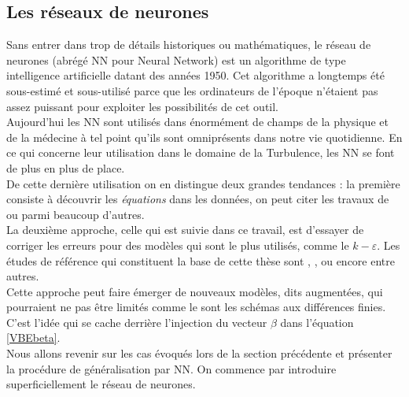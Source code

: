 \documentclass[a4paper,12pt]{article}
\newcommand{\keps}{$k-\varepsilon$}
\newcommand\bk{\color{black}}
\newcommand\brick{\color{brick}}
\numberwithin{equation}{section} %
\begin{document}
\brick \subsection{Les réseaux de neurones} \bk 
\noindent Sans entrer dans trop de détails historiques ou mathématiques, le réseau de neurones (abrégé NN pour Neural Network) est un algorithme de type intelligence artificielle datant des années 1950. Cet algorithme a longtemps été sous-estimé et sous-utilisé parce que les ordinateurs de l'époque n'étaient pas assez puissant pour exploiter les possibilités de cet outil.\\
Aujourd'hui les NN sont utilisés dans énormément de champs de la physique et de la médecine à tel point qu'ils sont omniprésents dans notre vie quotidienne. En ce qui concerne leur utilisation dans le domaine de la Turbulence, les NN se font de plus en plus de place. \\
De cette dernière utilisation on en distingue deux grandes tendances : la première consiste à découvrir les \textit{équations} dans les données, on peut citer les travaux de \citep{kutz2017deep} ou \citep{raissi2018hidden} parmi beaucoup d'autres. \\
La deuxième approche, celle qui est suivie dans ce travail, est d'essayer de corriger les erreurs pour des modèles qui sont le plus utilisés, comme le \keps $ $. Les études de référence qui constituent la base de cette thèse sont \citep{parish2016paradigm}, \citep{singh2017machine}, \citep{wu2018data} ou encore \citep{wang2017physics} entre autres. \\

\noindent Cette approche peut faire émerger de nouveaux modèles, dits augmentées, qui pourraient ne pas être limités comme le sont les schémas aux différences finies. C'est l'idée qui se cache derrière l'injection du vecteur $\beta$ dans l'équation \eqref{VBEbeta}.\\
\noindent Nous allons revenir sur les cas évoqués lors de la section précédente et présenter la procédure de généralisation par NN. On commence par introduire superficiellement le réseau de neurones.
\end{document}
